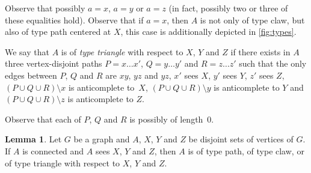 \documentclass[11pt]{article}
\newcommand{\sm}{\setminus}
\theoremstyle{definition}
\newtheorem{lemma}[theorem]{Lemma}
\theoremstyle{definition}
\begin{document}
Observe that possibly $a=x$, $a=y$ or $a=z$ (in fact, possibly two or
three of these equalities hold).
Observe that if $a=x$, then $A$ is not only of type claw, but also of type path centered at $X$, this case is additionally depicted in \cref{fig:types}.

We say that $A$ is of \emph{type triangle} with respect to $X$, $Y$
and $Z$ if there exists in $A$ three vertex-disjoint paths
$P = x\dots x'$, $Q= y\dots y'$ and $R= z\dots z'$ such that the only
edges between $P$, $Q$ and $R$ are $xy$, $yz$ and $yz$, $x'$ sees $X$,
$y'$ sees $Y$, $z'$ sees $Z$, $(P \cup Q \cup R) \sm x$ is
anticomplete to~$X$, $(P \cup Q \cup R) \sm y$ is anticomplete to $Y$
and $(P \cup Q \cup R) \sm z$ is anticomplete to $Z$.

Observe that each of $P$, $Q$ and $R$ is possibly of length~0. 

 

\begin{lemma}
  \label{l:type}
  Let $G$ be a graph and $A$, $X$, $Y$ and $Z$ be disjoint sets of
  vertices of $G$.  If $A$ is connected and $A$ sees $X$, $Y$ and $Z$,
  then $A$ is of type path, of type claw, or of type triangle with
  respect to $X$, $Y$ and $Z$.
\end{lemma}
\end{document}
